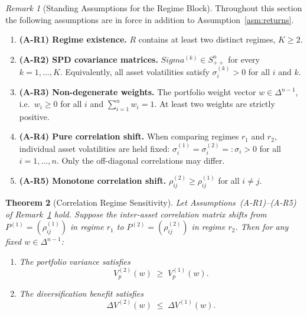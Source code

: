 \documentclass[12pt,openany]{book}
\newcommand{\bfw}{\mathbf{w}}
\newcommand{\bfSigma}{\boldsymbol{\Sigma}}
\numberwithin{equation}{chapter}
\theoremstyle{plain}
\newtheorem{theorem}{Theorem}[chapter]
\theoremstyle{definition}
\theoremstyle{remark}
\newtheorem{remark}[theorem]{Remark}
\def\mathcal#1{#1}%
\def\bfw{w}%
\def\bfSigma{Sigma}%
\begin{document}
\begin{remark}[Standing Assumptions for the Regime Block]
\label{rem:regime-assumptions}
Throughout this section the following assumptions are in force in
addition to Assumption~\ref{asm:returns}.
\begin{enumerate}
  \item \textbf{(A-R1) Regime existence.}\;
        $\mathcal{R}$ contains at least two distinct regimes, $K \geq 2$.
  \item \textbf{(A-R2) SPD covariance matrices.}\;
        $\bfSigma^{(k)} \in \mathcal{S}_{++}^{n}$ for every $k = 1, \ldots, K$.
        Equivalently, all asset volatilities satisfy
        $\sigma_i^{(k)} > 0$ for all $i$ and $k$.
  \item \textbf{(A-R3) Non-degenerate weights.}\;
        The portfolio weight vector $\bfw \in \Delta^{n-1}$, i.e.\
        $w_i \geq 0$ for all $i$ and $\sum_{i=1}^n w_i = 1$.
        At least two weights are strictly positive.
  \item \textbf{(A-R4) Pure correlation shift.}\;
        When comparing regimes $r_1$ and $r_2$, individual asset
        volatilities are held fixed: $\sigma_i^{(1)} = \sigma_i^{(2)}
        =: \sigma_i > 0$ for all $i = 1, \ldots, n$.  Only the
        off-diagonal correlations may differ.
  \item \textbf{(A-R5) Monotone correlation shift.}\;
        $\rho_{ij}^{(2)} \geq \rho_{ij}^{(1)}$ for all $i \neq j$.
\end{enumerate}
\end{remark}

\begin{theorem}[Correlation Regime Sensitivity]
\label{thm:correlation-regime}
Let Assumptions~\textup{(A-R1)}--\textup{(A-R5)} of
Remark~\ref{rem:regime-assumptions} hold.
Suppose the inter-asset correlation matrix shifts from
$P^{(1)} = (\rho_{ij}^{(1)})$ in regime $r_1$ to
$P^{(2)} = (\rho_{ij}^{(2)})$ in regime $r_2$.
Then for any fixed $\bfw \in \Delta^{n-1}$:
\begin{enumerate}
  \item[\textup{(i)}] The portfolio variance satisfies
    \begin{equation}
      V_p^{(2)}(\bfw) \;\geq\; V_p^{(1)}(\bfw).
      \label{eq:corr-regime-ineq}
    \end{equation}
  \item[\textup{(ii)}] The diversification benefit satisfies
    \begin{equation}
      \Delta V^{(2)}(\bfw) \;\leq\; \Delta V^{(1)}(\bfw).
      \label{eq:div-regime-ineq}
    \end{equation}
\end{enumerate}
\end{theorem}
\end{document}
